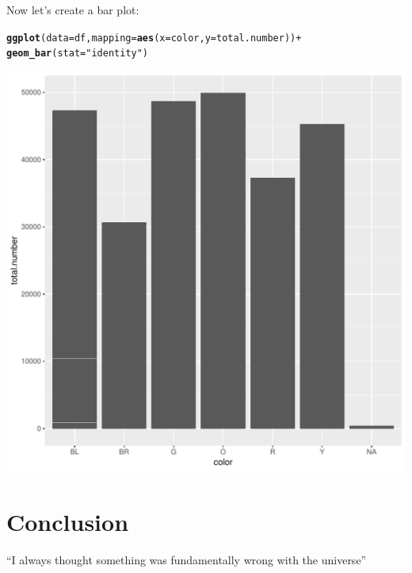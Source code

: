 \documentclass{article}\usepackage[]{graphicx}\usepackage[]{color}
\makeatletter
\def\maxwidth{ %
  \ifdim\Gin@nat@width>\linewidth
    \linewidth
  \else
    \Gin@nat@width
  \fi
}
\newcommand{\hlstr}[1]{\textcolor[rgb]{0.192,0.494,0.8}{#1}}%
\newcommand{\hlopt}[1]{\textcolor[rgb]{0,0,0}{#1}}%
\newcommand{\hlstd}[1]{\textcolor[rgb]{0.345,0.345,0.345}{#1}}%
\newcommand{\hlkwc}[1]{\textcolor[rgb]{0.333,0.667,0.333}{#1}}%
\newcommand{\hlkwd}[1]{\textcolor[rgb]{0.737,0.353,0.396}{\textbf{#1}}}%
\newenvironment{kframe}{%
 \def\at@end@of@kframe{}%
 \ifinner\ifhmode%
  \def\at@end@of@kframe{\end{minipage}}%
  \begin{minipage}{\columnwidth}%
 \fi\fi%
 \def\FrameCommand##1{\hskip\@totalleftmargin \hskip-\fboxsep
 \colorbox{shadecolor}{##1}\hskip-\fboxsep
     \hskip-\linewidth \hskip-\@totalleftmargin \hskip\columnwidth}%
 \MakeFramed {\advance\hsize-\width
   \@totalleftmargin\z@ \linewidth\hsize
   \@setminipage}}%
 {\par\unskip\endMakeFramed%
 \at@end@of@kframe}
\newenvironment{knitrout}{}{} %
\makeatother
\begin{document}
Now let's create a bar plot:
\begin{knitrout}
\color{fgcolor}\begin{kframe}
\begin{alltt}
\hlkwd{ggplot}\hlstd{(}\hlkwc{data}\hlstd{=df,}\hlkwc{mapping} \hlstd{=} \hlkwd{aes}\hlstd{(}\hlkwc{x}\hlstd{=color,}\hlkwc{y}\hlstd{=total.number))} \hlopt{+}
  \hlkwd{geom_bar}\hlstd{(}\hlkwc{stat}\hlstd{=}\hlstr{"identity"}\hlstd{)}
\end{alltt}
\end{kframe}
\includegraphics[width=\maxwidth]{figure/unnamed-chunk-5-1} 

\end{knitrout}

\section{Conclusion}
``I always thought something was fundamentally wrong with the universe'' \citep{adams1995hitchhiker}



\end{document}
